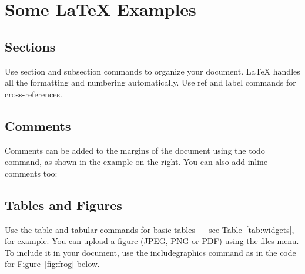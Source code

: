 \documentclass[12pt]{article}
\begin{document}
		\section{Some \LaTeX{} Examples}
		\label{sec:examples}
		
		\subsection{Sections}
		
		Use section and subsection commands to organize your document. \LaTeX{} handles all the formatting and numbering automatically. Use ref and label commands for cross-references.
		
		\subsection{Comments}
		
		Comments can be added to the margins of the document using the  todo command, as shown in the example on the right. You can also add inline comments too:
		
		
		\subsection{Tables and Figures}
		
		Use the table and tabular commands for basic tables --- see Table~\ref{tab:widgets}, for example. You can upload a figure (JPEG, PNG or PDF) using the files menu. To include it in your document, use the includegraphics command as in the code for Figure~\ref{fig:frog} below.
		
		
		
\end{document}
